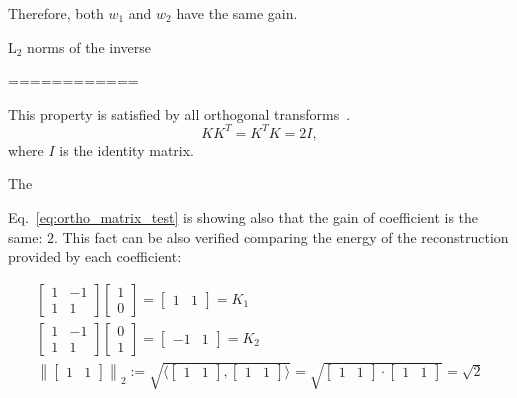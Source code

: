 Therefore, both $w_1$ and $w_2$ have the same gain.

L$_2$ norms of the inverse

============

 This
property is satisfied by all orthogonal
transforms~\cite{sayood2017introduction}.
\begin{equation}
  KK^T=K^TK=2I,
  \label{eq:ortho_matrix_test}
\end{equation}
where $I$ is the identity matrix.

The 

Eq.~\ref{eq:ortho_matrix_test} is showing also that the gain of
coefficient is the same: $2$. This fact can be also verified comparing
the energy of the reconstruction provided by each coefficient:

\begin{equation*}
  \begin{array}{l}
    \begin{bmatrix}
      1 & -1 \\
      1 & 1
    \end{bmatrix}
    \begin{bmatrix}
      1 \\
      0
    \end{bmatrix}
    =
    \begin{bmatrix}
      1 & 1
    \end{bmatrix} = K_1
    \\
    \begin{bmatrix}
      1 & -1 \\
      1 & 1
    \end{bmatrix}
    \begin{bmatrix}
      0 \\
      1
    \end{bmatrix}
    =
    \begin{bmatrix}
      -1 & 1
    \end{bmatrix} = K_2
    \\
    \left\| \begin{bmatrix}1 & 1\end{bmatrix} \right\|_2 := \sqrt{\langle \begin{bmatrix}1 & 1\end{bmatrix}, \begin{bmatrix}1 & 1\end{bmatrix} \rangle} = \sqrt{\begin{bmatrix}1 & 1\end{bmatrix}\cdot \begin{bmatrix}1 & 1\end{bmatrix}} = \sqrt{2}\\

\end{array}
\end{equation*}
